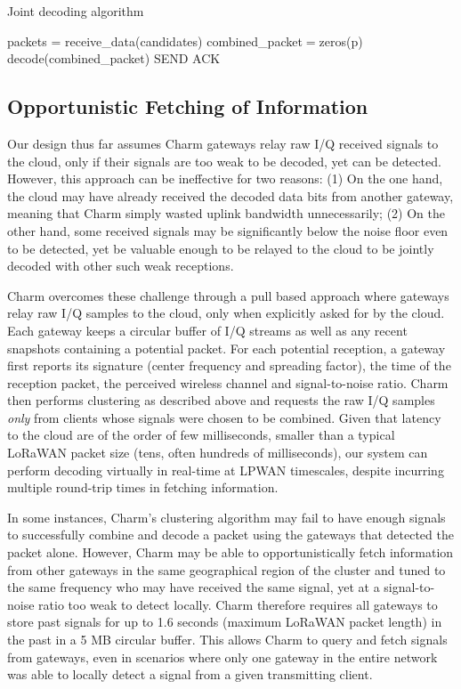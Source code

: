 \LinesNumbered
\begin{algorithm}[t]
\caption{Joint decoding algorithm}
\label{alg:algorithm-label}
 packets = receive\_data(candidates)\;
 combined\_packet$=$zeros(p)\;
 decode(combined\_packet)\;
 SEND ACK\;
 \end{algorithm}

\subsection{Opportunistic Fetching of Information}
Our design thus far assumes Charm gateways relay raw I/Q received signals to
the cloud, only if their signals are too weak to be decoded, yet can be
detected. However, this approach can be ineffective for two reasons: (1) On
the one hand, the cloud may have already received the decoded data bits from
another gateway, meaning that Charm simply wasted uplink bandwidth
unnecessarily; (2) On the other hand, some received signals may be
significantly below the noise floor even to be detected, yet be valuable
enough to be relayed to the cloud to be jointly decoded with other such weak
receptions.

 Charm overcomes these challenge through
a pull based approach where gateways relay raw I/Q samples to the cloud, only
when explicitly asked for by the cloud. Each gateway keeps a circular buffer
of I/Q streams as well as any recent snapshots containing a potential packet.
For each potential reception, a gateway first reports its signature (center
frequency and spreading factor), the time of the reception packet, the
perceived wireless channel and signal-to-noise ratio. Charm then performs
clustering as described above and requests the raw I/Q samples {\it only }
from clients whose signals were chosen to be combined. Given that latency to
the cloud are of the order of few milliseconds, smaller than a typical LoRaWAN
packet size (tens, often hundreds of milliseconds), our system can perform
decoding virtually in real-time at LPWAN timescales, despite incurring
multiple round-trip times in fetching information.

 In some instances, Charm's
clustering algorithm may fail to have enough signals to successfully combine
and decode a packet using the gateways that detected the packet alone.
However, Charm may be able to opportunistically fetch information from other
gateways in the same geographical region of the cluster and tuned to the same
frequency who may have received the same signal, yet at a signal-to-noise
ratio too weak to detect locally. Charm therefore requires all gateways to
store past signals for up to 1.6 seconds (maximum LoRaWAN packet length) in
the past in a 5 MB circular buffer. This allows Charm to query and fetch
signals from gateways, even in scenarios where only one gateway in the entire
network was able to locally detect a signal from a given transmitting client.